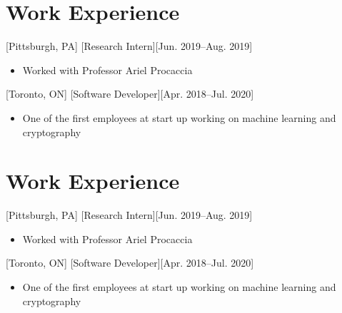 \documentclass{article}
\begin{document}
\section{Work Experience}
    [Pittsburgh, PA]
    [Research Intern][Jun. 2019--Aug. 2019]
    \begin{itemize}[noitemsep,nolistsep]
        \item Worked with Professor Ariel Procaccia
    \end{itemize}

    [Toronto, ON]
    [Software Developer][Apr. 2018--Jul. 2020]
    \begin{itemize}[noitemsep,nolistsep]
        \item One of the first employees at start up working on machine learning and cryptography
    \end{itemize}
\section{Work Experience}
    [Pittsburgh, PA]
    [Research Intern][Jun. 2019--Aug. 2019]
    \begin{itemize}[noitemsep,nolistsep]
        \item Worked with Professor Ariel Procaccia
    \end{itemize}

    [Toronto, ON]
    [Software Developer][Apr. 2018--Jul. 2020]
    \begin{itemize}[noitemsep,nolistsep]
        \item One of the first employees at start up working on machine learning and cryptography
    \end{itemize}


    
    
\end{document}
